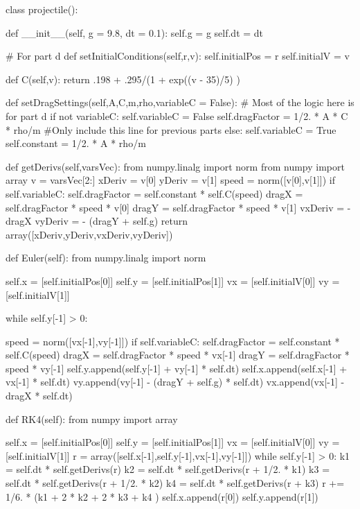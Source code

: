 \begin{enumerate}
\begin{codeexample}
\begin{VerbatimOut}{\listingFile}
class projectile():

    def __init__(self, g = 9.8, dt = 0.1):
        self.g = g
        self.dt = dt

        # For part d
    def setInitialConditions(self,r,v):
        self.initialPos = r
        self.initialV = v

    def C(self,v):
        return .198 + .295/(1 + exp((v - 35)/5) )

    def setDragSettings(self,A,C,m,rho,variableC = False):
        # Most of the logic here is for part d
        if not variableC:
            self.variableC = False
            self.dragFactor = 1/2. * A * C * rho/m  #Only include this line for previous parts
        else:
            self.variableC = True
            self.constant = 1/2. * A * rho/m

    def getDerivs(self,varsVec):
        from numpy.linalg import norm
        from numpy import array
        v = varsVec[2:]
        xDeriv = v[0]
        yDeriv = v[1]
        speed = norm([v[0],v[1]])
        if self.variableC:
            self.dragFactor = self.constant * self.C(speed)
        dragX = self.dragFactor * speed * v[0]
        dragY = self.dragFactor * speed * v[1]
        vxDeriv = - dragX
        vyDeriv = - (dragY + self.g)
        return array([xDeriv,yDeriv,vxDeriv,vyDeriv])


    def Euler(self):
        from numpy.linalg import norm

        self.x = [self.initialPos[0]]
        self.y = [self.initialPos[1]]
        vx = [self.initialV[0]]
        vy = [self.initialV[1]]

        while self.y[-1] > 0:

            speed = norm([vx[-1],vy[-1]])
            if self.variableC:
                self.dragFactor = self.constant * self.C(speed)
            dragX = self.dragFactor * speed * vx[-1]
            dragY = self.dragFactor * speed * vy[-1]
            self.y.append(self.y[-1] + vy[-1] * self.dt)
            self.x.append(self.x[-1] + vx[-1] * self.dt)
            vy.append(vy[-1] - (dragY + self.g) * self.dt)
            vx.append(vx[-1] - dragX * self.dt)

    def RK4(self):
        from numpy import array

        self.x = [self.initialPos[0]]
        self.y = [self.initialPos[1]]
        vx = [self.initialV[0]]
        vy = [self.initialV[1]]
        r = array([self.x[-1],self.y[-1],vx[-1],vy[-1]])
        while self.y[-1] > 0:
            k1 = self.dt * self.getDerivs(r)
            k2 = self.dt * self.getDerivs(r + 1/2. * k1)
            k3 = self.dt * self.getDerivs(r + 1/2. * k2)
            k4 = self.dt * self.getDerivs(r + k3)
            r += 1/6. * (k1 + 2 * k2 + 2 * k3 + k4 )
            self.x.append(r[0])
            self.y.append(r[1])



\end{VerbatimOut}
\end{codeexample}
\end{enumerate}
